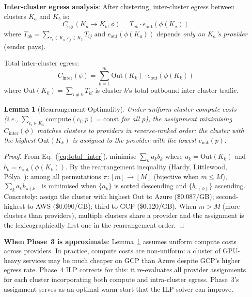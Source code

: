 \documentclass[10pt,journal]{IEEEtran}
\newtheorem{lemma}[theorem]{Lemma}
\begin{document}
\textbf{Inter-cluster egress analysis}:
After clustering, inter-cluster egress between clusters $K_a$ and $K_b$ is:
\begin{equation}\label{eq:inter_egress}
C_{\text{egr}}(K_a \to K_b, \phi) = T_{ab} \cdot e_{\text{out}}(\phi(K_a))
\end{equation}
where $T_{ab} = \sum_{c_i\in K_a, c_j\in K_b} T_{ij}$ and $e_{\text{out}}(\phi(K_a))$
depends \emph{only on $K_a$'s provider} (sender pays).

Total inter-cluster egress:
\begin{equation}\label{eq:total_inter}
C_{\text{inter}}(\phi) = \sum_{k=1}^{m} \text{Out}(K_k) \cdot e_{\text{out}}(\phi(K_k))
\end{equation}
where $\text{Out}(K_k) = \sum_{l \neq k} T_{kl}$ is cluster $k$'s total outbound
inter-cluster traffic.

\begin{lemma}[Rearrangement Optimality]\label{lem:rearrange}
Under uniform cluster compute costs (i.e., $\sum_{c_i\in K_k}\text{compute}(c_i,p) = \text{const}$
for all $p$), the assignment minimising $C_{\text{inter}}(\phi)$ matches clusters
to providers in reverse-ranked order: the cluster with the highest $\text{Out}(K_k)$
is assigned to the provider with the lowest $e_{\text{out}}(p)$.
\end{lemma}
\begin{proof}
From Eq.~(\ref{eq:total_inter}), minimise $\sum_k a_k b_k$ where
$a_k = \text{Out}(K_k)$ and $b_k = e_{\text{out}}(\phi(K_k))$.
By the rearrangement inequality (Hardy, Littlewood, P\'olya~\cite{hardy1952}):
among all permutations $\pi: [m] \to [M]$ (bijective when $m \leq M$),
$\sum_k a_k b_{\pi(k)}$ is minimised when $\{a_k\}$ is sorted descending
and $\{b_{\pi(k)}\}$ ascending.
Concretely: assign the cluster with highest $\text{Out}$ to Azure (\$0.087/GB);
second-highest to AWS (\$0.090/GB); third to GCP (\$0.120/GB).
When $m > M$ (more clusters than providers), multiple clusters share a provider
and the assignment is the lexicographically first one in the rearrangement order.
\end{proof}

\textbf{When Phase~3 is approximate}:
Lemma~\ref{lem:rearrange} assumes uniform compute costs across providers.
In practice, compute costs are non-uniform: a cluster of GPU-heavy services may
be much cheaper on GCP than Azure despite GCP's higher egress rate.
Phase~4 ILP corrects for this: it re-evaluates all provider assignments for each
cluster incorporating both compute and intra-cluster egress.
Phase~3's assignment serves as an optimal warm-start that the ILP solver can improve.
\end{document}

